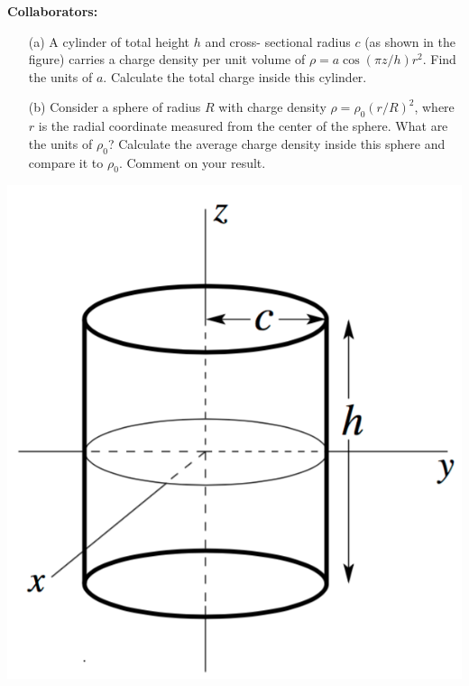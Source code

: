 \documentclass[11pt,letterpaper,boxed]{hmcpset}
\begin{document}
	
	\noindent\textbf{Collaborators:} 
	
	
	\begin{problem}[(10 points)]
		\begin{enumerate}
			\item[(a)] A cylinder of total height $h$ and cross- sectional radius $c$ (as shown in the figure) carries a charge density per unit volume of $\rho = a \cos (πz/h)r^2$. Find the units of $a$. Calculate the total charge inside this cylinder.
			\item[(b)]Consider a sphere of radius $R$ with charge density $\rho = \rho_0(r/R)^2$, where $r$ is the radial coordinate measured from the center of the sphere. What are the units of $\rho_0$? Calculate the average charge density inside this sphere and compare it to $\rho_0$. Comment on your result.
		\end{enumerate}
		\begin{center}
			\includegraphics[scale=0.4]{10-point.png}
		\end{center}
		
	\end{problem}
	
\end{document}
